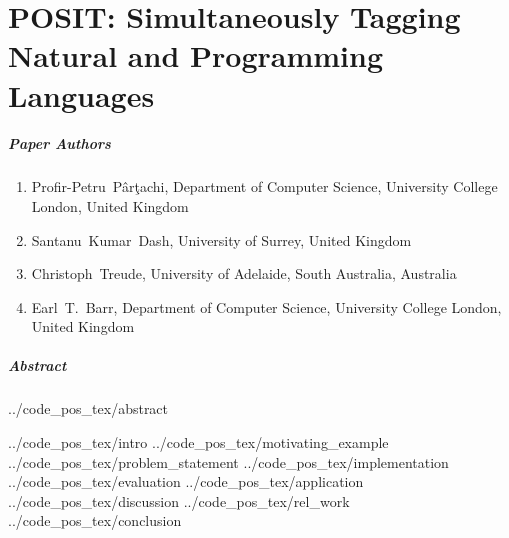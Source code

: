 \chapter{POSIT: Simultaneously Tagging Natural and Programming Languages}
\label{chapter:posit}

\renewcommand{\ourtool}{\textsc{POSIT}\xspace}
\renewcommand{\Ourtool}{\textsc{POSIT}\xspace}
\newcommand{\stormed}{StORMeD\xspace}
\newcommand{\SO}{Stack Overflow\xspace}
\newcommand{\projurl}{\url{https://github.com/PPPI/POSIT}\xspace}

\paragraph{Paper Authors}
\begin{enumerate}
    \item[] Profir-Petru~P\^ar\c{t}achi, Department of Computer Science, University College London, United Kingdom
    \item[] Santanu~Kumar~Dash, University of Surrey, United Kingdom
    \item[] Christoph~Treude, University of Adelaide, South Australia, Australia
    \item[] Earl~T.~Barr, Department of Computer Science, University College London, United Kingdom
\end{enumerate}

\paragraph{Abstract}
{../code_pos_tex/abstract}

{../code_pos_tex/intro}
{../code_pos_tex/motivating_example}
{../code_pos_tex/problem_statement}
{../code_pos_tex/implementation}
{../code_pos_tex/evaluation}
{../code_pos_tex/application}
{../code_pos_tex/discussion}
{../code_pos_tex/rel_work}
{../code_pos_tex/conclusion}